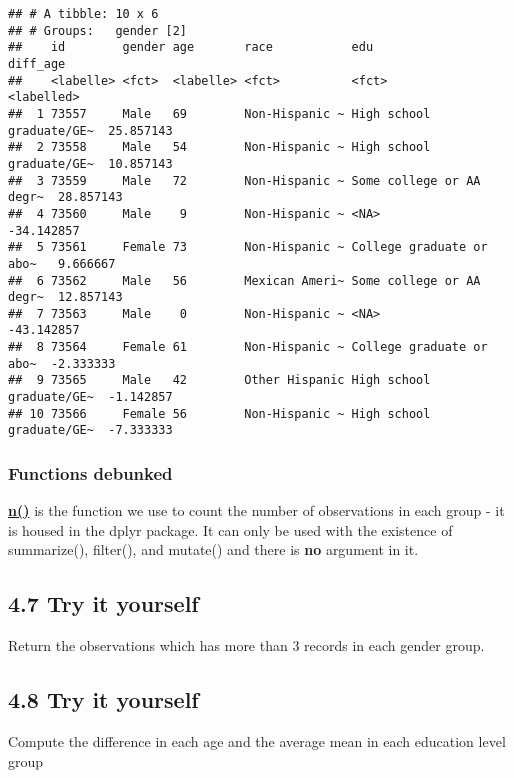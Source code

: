 \documentclass[
]{book}
\begin{document}
\begin{verbatim}
## # A tibble: 10 x 6
## # Groups:   gender [2]
##    id        gender age       race           edu                      diff_age  
##    <labelle> <fct>  <labelle> <fct>          <fct>                    <labelled>
##  1 73557     Male   69        Non-Hispanic ~ High school graduate/GE~  25.857143
##  2 73558     Male   54        Non-Hispanic ~ High school graduate/GE~  10.857143
##  3 73559     Male   72        Non-Hispanic ~ Some college or AA degr~  28.857143
##  4 73560     Male    9        Non-Hispanic ~ <NA>                     -34.142857
##  5 73561     Female 73        Non-Hispanic ~ College graduate or abo~   9.666667
##  6 73562     Male   56        Mexican Ameri~ Some college or AA degr~  12.857143
##  7 73563     Male    0        Non-Hispanic ~ <NA>                     -43.142857
##  8 73564     Female 61        Non-Hispanic ~ College graduate or abo~  -2.333333
##  9 73565     Male   42        Other Hispanic High school graduate/GE~  -1.142857
## 10 73566     Female 56        Non-Hispanic ~ High school graduate/GE~  -7.333333
\end{verbatim}

\hypertarget{functions-debunked-16}{%
\subsubsection{Functions debunked}\label{functions-debunked-16}}

\href{https://www.rdocumentation.org/packages/dplyr/versions/0.7.8/topics/n}{\textbf{n()}} is the function we use to count the number of observations in each group - it is housed in the dplyr package. It can only be used with the existence of summarize(), filter(), and mutate() and there is \textbf{no} argument in it.

\hypertarget{try-it-yourself-20}{%
\subsection{4.7 Try it yourself}\label{try-it-yourself-20}}

Return the observations which has more than 3 records in each gender group.

\hypertarget{try-it-yourself-21}{%
\subsection{4.8 Try it yourself}\label{try-it-yourself-21}}

Compute the difference in each age and the average mean in each education level group
\end{document}
